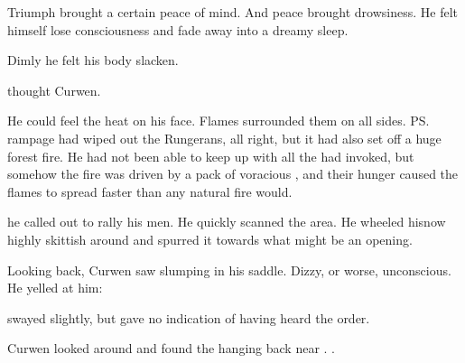 Triumph brought a certain peace of mind. 
And peace brought drowsiness. 
He felt himself lose consciousness and fade away into a dreamy sleep. 

Dimly he felt his body slacken. 







\begin{comment}
\subsection{Curwen pulls everyone out}
\end{comment}
\new
{} thought Curwen. 

He could feel the heat on his face. 
Flames surrounded them on all sides. 
\ps{\Shireyo}{} rampage had wiped out the Rungerans, all right, but it had also set off a huge forest fire. 
He had not been able to keep up with all the \Archons{} \Shireyo{} had invoked, but somehow the fire was driven by a pack of voracious \qliphoth, and their hunger caused the flames to spread faster than any natural fire would. 

 he called out to rally his men. 
He quickly scanned the area. 
He wheeled his\dash now highly skittish\dash \relc{} around and spurred it towards what might be an opening. 

Looking back, Curwen saw \Shireyo{} slumping in his saddle. 
Dizzy, or worse, unconscious. 
He yelled at him: 

\Shireyo{} swayed slightly, but gave no indication of having heard the order. 

Curwen looked around and found the \meccaran{} hanging back near \Shireyo. 
\Tsekkect{}. 


